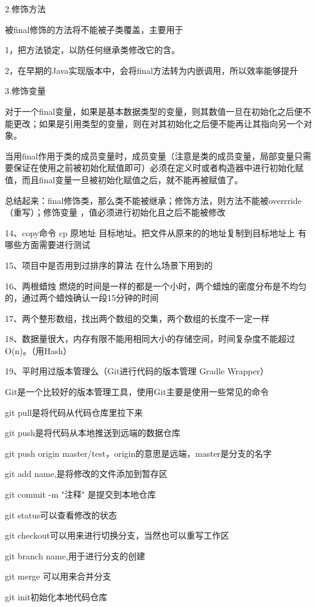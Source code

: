 \documentclass[UTF8]{ctexart}
\begin{document}
2.修饰方法

被final修饰的方法将不能被子类覆盖，主要用于

1，把方法锁定，以防任何继承类修改它的含。

2，在早期的Java实现版本中，会将final方法转为内嵌调用，所以效率能够提升


3.修饰变量

对于一个final变量，如果是基本数据类型的变量，则其数值一旦在初始化之后便不能更改；如果是引用类型的变量，则在对其初始化之后便不能再让其指向另一个对象。

当用final作用于类的成员变量时，成员变量（注意是类的成员变量，局部变量只需要保证在使用之前被初始化赋值即可）必须在定义时或者构造器中进行初始化赋值，而且final变量一旦被初始化赋值之后，就不能再被赋值了。

总结起来：final修饰类，那么类不能被继承；修饰方法，则方法不能被overrride（重写）；修饰变量 ，值必须进行初始化且之后不能被修改

14、copy命令 cp 原地址 目标地址。把文件从原来的的地址复制到目标地址上 有哪些方面需要进行测试

15、项目中是否用到过排序的算法 在什么场景下用到的

16、两根蜡烛 燃烧的时间是一样的都是一个小时，两个蜡烛的密度分布是不均匀的，通过两个蜡烛确认一段15分钟的时间

17、两个整形数组，找出两个数组的交集，两个数组的长度不一定一样

18、数据量很大，内存有限不能用相同大小的存储空间，时间复杂度不能超过O(n)。（用Hash）

19、平时用过版本管理么（Git进行代码的版本管理 Gradle Wrapper）

Git是一个比较好的版本管理工具，使用Git主要是使用一些常见的命令

git pull是将代码从代码仓库里拉下来

git push是将代码从本地推送到远端的数据仓库

git push origin master/test，origin的意思是远端，master是分支的名字

git add name,是将修改的文件添加到暂存区

git commit -m "注释" 是提交到本地仓库

git status可以查看修改的状态

git checkout可以用来进行切换分支，当然也可以重写工作区

git branch name,用于进行分支的创建

git merge 可以用来合并分支

git init初始化本地代码仓库
\end{document}
